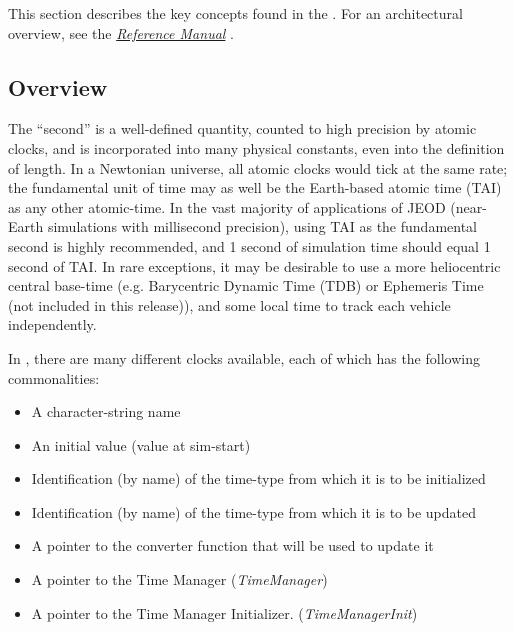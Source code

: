 %
%
% 
%





This section describes the key concepts found in the \timeDesc.  For an
architectural overview, see the 
\href{file:refman.pdf} {\em Reference Manual} \cite{timebib:ReferenceManual}.

\subsection{Overview}

The {\textquotedblleft}second{\textquotedblright} is a well-defined
quantity, counted to high precision by atomic clocks, and is
incorporated into many physical constants, even into the definition of
length.  In a Newtonian universe, all atomic clocks would tick at the
same rate; the fundamental unit of time may as well be the Earth-based
atomic time (TAI) as any other atomic-time.  In the vast majority of
applications of JEOD (near-Earth simulations with millisecond
precision), using TAI as the fundamental second is highly recommended,
and 1 second of simulation time should equal 1 second of TAI.  In rare
exceptions, it may be desirable to use a more heliocentric central
base-time (e.g. Barycentric Dynamic Time (TDB) or Ephemeris Time (not
included in this release)), and some local time to track each vehicle
independently.



In \JEODid, there are many different clocks available, each of which has
the following commonalities:




\begin{itemize}
\item A character-string name
\item An initial value (value at sim-start)
\item Identification (by name) of the time-type from which it is to be
initialized
\item Identification (by name) of the time-type from which it is to be
updated
\item A pointer to the converter function that will be used to update it
\item A pointer to the Time Manager (\textit{TimeManager})
\item A pointer to the Time Manager Initializer.
(\textit{TimeManagerInit})
\end{itemize}



